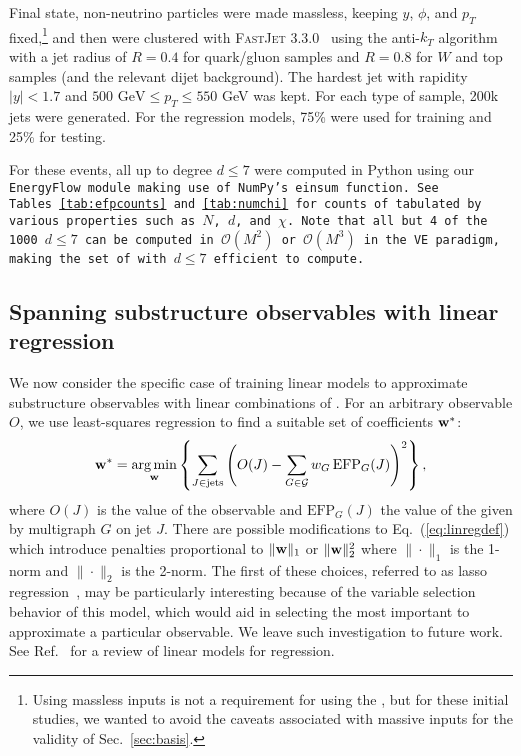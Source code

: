 \documentclass[letterpaper,11pt]{article}
\providecommand{\href}[2]{#2}
\DeclareRobustCommand{\Sec}[1]{Sec.~\ref{#1}}
\DeclareRobustCommand{\Tabs}[2]{Tables~\ref{#1} and \ref{#2}}
\DeclareRobustCommand{\Eq}[1]{Eq.~(\ref{#1})}
\DeclareRobustCommand{\Ref}[1]{Ref.~\cite{#1}}
\newcommand{\B}{\text{EFP}\xspace}
\newcommand{\Bs}{\text{EFPs}\xspace}
\begin{document}
Final state, non-neutrino particles were made massless, keeping $y$, $\phi$, and $p_T$ fixed,\footnote{Using massless inputs is not a requirement for using the \Bs, but for these initial \B studies, we wanted to avoid the caveats associated with massive inputs for the validity of \Sec{sec:basis}.} and then were clustered with \textsc{FastJet 3.3.0}~\cite{Cacciari:2011ma} using the anti-$k_T$ algorithm~\cite{Cacciari:2008gp} with a jet radius of $R=0.4$ for quark/gluon samples and $R = 0.8$ for $W$ and top samples (and the relevant dijet background). 
%
The hardest jet with rapidity $|y|<1.7$ and $500\text{ GeV}\le p_T\le550$ GeV was kept. 
%
For each type of sample, 200k jets were generated. 
%
For the regression models, 75\% were used for training and 25\% for testing.

For these events, all \Bs up to degree $d\le7$ were computed in Python using our \href{https://pkomiske.github.io/EnergyFlow}{\tt EnergyFlow} module making use of {\tt NumPy}'s einsum function. 
%
See \Tabs{tab:efpcounts}{tab:numchi} for counts of \Bs tabulated by various properties such as $N$, $d$, and $\chi$. 
%
Note that all but 4 of the 1000 $d\le 7$ \Bs can be computed in $\mathcal O(M^2)$ or $\mathcal O(M^3)$ in the VE paradigm, making the set of \Bs with $d\le 7$ efficient to compute.


\subsection{Spanning substructure observables with linear regression}
\label{sec:regression}

We now consider the specific case of training linear models to approximate substructure observables with linear combinations of \Bs. 
%
For an arbitrary observable $O$, we use least-squares regression to find a suitable set of coefficients ${\bf w}^*$:
\begin{equation}\label{eq:linregdef}
{\bf w}^* = \underset{\bf w}{\arg\min} \left\{\sum_{J\in\text{jets}}\left(O(J) - \sum_{G\in\mathcal G} w_G \,\B_G(J)\right)^2\right\},
\end{equation}
where $O(J)$ is the value of the observable and $\B_G(J)$ the value of the \B given by multigraph $G$ on jet $J$. 
%
There are possible modifications to \Eq{eq:linregdef} which introduce penalties proportional to $\|{\bf w}\|_1$ or $\|{\bf w}\|_2^2$ where $\|\cdot\|_1$ is the 1-norm and $\|\cdot\|_2$ is the 2-norm. 
%
The first of these choices, referred to as lasso regression~\cite{tibshirani1996regression}, may be particularly interesting because of the variable selection behavior of this model, which would aid in selecting the most important \Bs to approximate a particular observable. 
%
We leave such investigation to future work. See \Ref{bishop2006pattern} for a review of linear models for regression.
\end{document}
